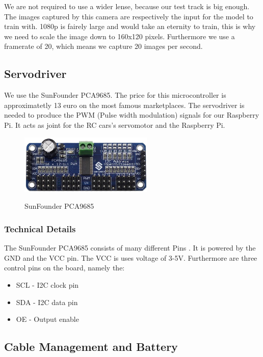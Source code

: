 \documentclass[journal]{IEEEtran}
\begin{document}
We are not required to use a wider lense, because our test track is big enough. The images captured by this camera are respectively the input for the model to train with. 1080p is fairely large and would take an eternity to train, this is why we need to scale the image down to 160x120 pixels. Furthermore we use a framerate of 20, which means we capture 20 images per second.  

\subsection{Servodriver}
We use the SunFounder PCA9685. The price for this microcontroller is approximatetly 13 euro on the most famous marketplaces. The servodriver is needed to produce the PWM (Pulse width modulation) signals for our Raspberry Pi. It acts as joint for the RC cars's servomotor and the Raspberry Pi. \\

\begin{figure}
  \begin{center}
  \includegraphics[width=2.5in]{photo/sunfounder.jpeg}\\
  \caption{SunFounder PCA9685}\label{servodriver}
  \end{center}
\end{figure}

\subsubsection{Technical Details}
The SunFounder PCA9685 consists of many different Pins \cite{servo}. It is powered by the GND and the VCC pin. The VCC is uses voltage of 3-5V. Furthermore are three control pins on the board, namely the:

\begin{itemize}
\item SCL - I2C clock pin
\item SDA - I2C data pin 
\item OE - Output enable 
\end{itemize}

\subsection{Cable Management and Battery}
\end{document}
